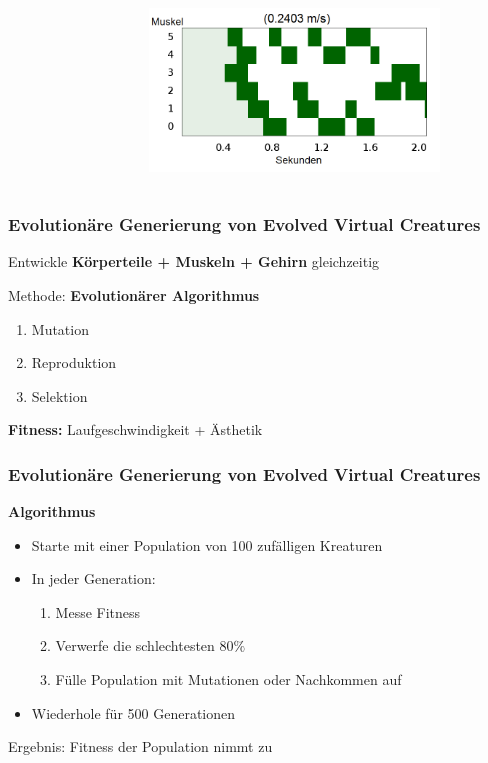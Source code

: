 \documentclass{beamer}
\begin{document}
\begin{frame}
\begin{columns}
\begin{figure}
		\end{figure}
		\begin{figure}
			\includegraphics[width=0.9\textwidth]{img/hum36.png}
		\end{figure}
	\end{columns}
\end{frame}


\begin{frame}
	\frametitle{Evolutionäre Generierung von Evolved Virtual Creatures}
	Entwickle \textbf{Körperteile + Muskeln + Gehirn} gleichzeitig\\ \pause
	\vspace{2em}
	
	Methode: \textbf{Evolutionärer Algorithmus} \pause
	\begin{enumerate}
		\item Mutation
		\item Reproduktion
		\item Selektion
	\end{enumerate}
	\pause
	\vspace{2em}
	\textbf{Fitness:} Laufgeschwindigkeit \pause  + Ästhetik
\end{frame}

\begin{frame}
	\frametitle{Evolutionäre Generierung von Evolved Virtual Creatures}
	\textbf{Algorithmus}\\
	\vspace{1em}
	
	\begin{itemize}
		\item Starte mit einer Population von 100 zufälligen Kreaturen \\
		\vspace{1em}
		\item In jeder Generation:
		\begin{enumerate}
			\item Messe Fitness
			\item Verwerfe die schlechtesten $80\%$
			\item Fülle Population mit Mutationen oder Nachkommen auf
		\end{enumerate}
		\vspace{1em}
		\item Wiederhole für 500 Generationen\\
	\end{itemize}
	\vspace{2em}
	Ergebnis: Fitness der Population nimmt zu \checkmark
\end{frame}
\end{document}
